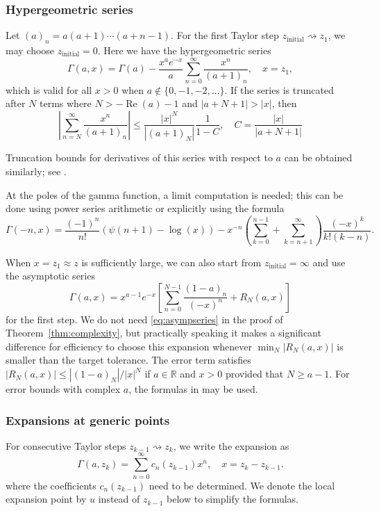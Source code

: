 \documentclass[reqno]{amsart}
\newcommand{\RR}{\mathbb{R}}
\newcommand{\be}{\begin{equation}}
\newcommand{\ee}{\end{equation}}
\theoremstyle{definition}
\begin{document}
\subsubsection{Hypergeometric series}

Let $(a)_n = a (a+1) \cdots (a+n-1)$.
For the first Taylor step $z_{\text{initial}} \rightsquigarrow z_1$,
we may choose $z_{\text{initial}} = 0$. Here we have the hypergeometric series
\be
\Gamma(a,x) = \Gamma(a) - \frac{x^a e^{-x}}{a} \sum_{n=0}^{\infty} \frac{x^n}{(a+1)_n}, \quad x = z_1,
\label{eq:hypser1}
\ee
which
is valid for all $x > 0$ when $a \not \in \{0, -1, -2, \ldots\}$.
If the series is truncated after $N$ terms where $N > -\operatorname{Re}(a) - 1$ and $|a+N+1| > |x|$,
then
\be
\left|\sum_{n=N}^{\infty} \frac{x^n}{(a+1)_n} \right| \le \frac{|x|^N}{|(a+1)_N|} \frac{1}{1-C}, \quad C = \frac{|x|}{|a+N+1|}
\label{eq:ser1bound}
\ee

Truncation bounds for derivatives of this series
with respect to $a$ can
be obtained similarly; see \cite[Theorem 1]{Johansson2019hypergeometric}.

At the poles of the gamma function, a limit computation is needed;
this can be done using power series arithmetic or explicitly using the formula~\cite[8.4.15]{DLMF}
\be
\Gamma(-n,x) = \frac{(-1)^n}{n!} (\psi(n+1) - \log(x)) - x^{-n} \left(\sum_{k=0}^{n-1} + \sum_{k=n+1}^{\infty}\right) \frac{(-x)^k}{k! (k-n)}.
\label{eq:singular}
\ee

When $x = z_1 \approx z$ is sufficiently large, we can also start from
$z_{\text{initial}} = \infty$ and use the asymptotic series
\be
\Gamma(a,x) = x^{a-1} e^{-x} \left[ \sum_{n=0}^{N-1} \frac{(1-a)_n}{(-x)^n} + R_N(a,x) \right]
\label{eq:asympseries}
\ee
for the first step.
We do not need \eqref{eq:asympseries} in the proof of Theorem~\ref{thm:complexity},
but practically speaking it makes a significant difference
for efficiency to choose this expansion whenever
$\min_N |R_N(a,x)|$ is smaller than the target tolerance.
The error term satisfies $|R_N(a,x)| \le |(1-a)_N| / |x|^N$ if $a \in \RR$
and $x > 0$ provided that $N \ge a - 1$. For error bounds with complex $a$,
the formulas in \cite[\S 13.7]{DLMF} may be used.

\subsubsection{Expansions at generic points}

For consecutive Taylor steps $z_{k-1} \rightsquigarrow z_{k}$,
we write the expansion as
\be
\Gamma(a,z_k) = \sum_{n=0}^{\infty} c_n(z_{k-1}) x^n, \quad x = z_k - z_{k-1}.
\label{eq:generictaylor}
\ee
where the coefficients $c_n(z_{k-1})$ need to be determined.
We denote the local
expansion point by $u$ instead of $z_{k-1}$ below to simplify the formulas.
\end{document}
